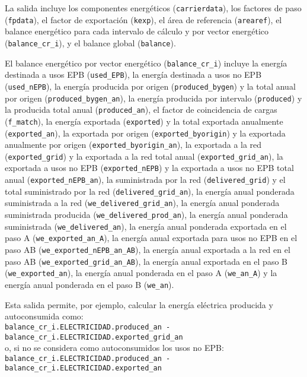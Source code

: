 \documentclass[10pt,notitlepage,oneside,a4paper]{article}
\begin{document}
La salida incluye los componentes energéticos (\texttt{carrierdata}), los factores de paso (\texttt{fpdata}), el factor de exportación (\texttt{kexp}), el área de referencia (\texttt{arearef}), el balance energético para cada intervalo de cálculo y por vector energético (\texttt{balance\_cr\_i}), y el balance global (\texttt{balance}).

El balance energético por vector energético (\texttt{balance\_cr\_i}) incluye la energía destinada a usos EPB (\texttt{used\_EPB}), la energía destinada a usos no EPB (\texttt{used\_nEPB}), la energía producida por origen (\texttt{produced\_bygen}) y la total anual por origen (\texttt{produced\_bygen\_an}), la energía producida por intervalo (\texttt{produced}) y la producida total anual (\texttt{produced\_an}), el factor de coincidencia de cargas (\texttt{f\_match}), la energía exportada (\texttt{exported}) y la total exportada anualmente (\texttt{exported\_an}), la exportada por origen (\texttt{exported\_byorigin}) y la exportada anualmente por origen (\texttt{exported\_byorigin\_an}), la exportada a la red (\texttt{exported\_grid}) y la exportada a la red total anual (\texttt{exported\_grid\_an}), la exportada a usos no EPB (\texttt{exported\_nEPB}) y la exportada a usos no EPB total anual (\texttt{exported\_nEPB\_an}), la suministrada por la red (\texttt{delivered\_grid}) y el total suministrado por la red (\texttt{delivered\_grid\_an}), la energía anual ponderada suministrada a la red (\texttt{we\_delivered\_grid\_an}), la energía anual ponderada suministrada producida (\texttt{we\_delivered\_prod\_an}), la energía anual ponderada suministrada (\texttt{we\_delivered\_an}), la energía anual ponderada exportada en el paso A (\texttt{we\_exported\_an\_A}), la energía anual exportada para usos no EPB en el paso AB (\texttt{we\_exported\_nEPB\_an\_AB}), la energía anual exportada a la red en el paso AB (\texttt{we\_exported\_grid\_an\_AB}), la energía anual exportada en el paso B (\texttt{we\_exported\_an}), la energía anual ponderada en el paso A (\texttt{we\_an\_A}) y la energía anual ponderada en el paso B (\texttt{we\_an}).

\begin{myquote}\small
Esta salida permite, por ejemplo, calcular la energía eléctrica producida y autoconsumida como:
\\

\texttt{balance\_cr\_i.ELECTRICIDAD.produced\_an - balance\_cr\_i.ELECTRICIDAD.exported\_grid\_an}
\\

o, si no se considera como autoconsumidos los usos no EPB:
\\

\texttt{balance\_cr\_i.ELECTRICIDAD.produced\_an - balance\_cr\_i.ELECTRICIDAD.exported\_an}
\end{myquote}
\end{document}

